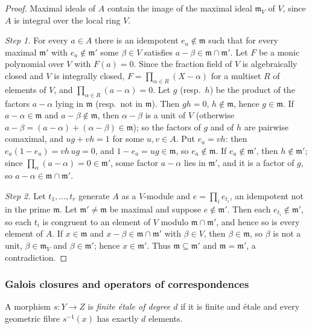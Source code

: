 \begin{proof}
Maximal ideals of $A$ contain the image of the maximal ideal $\mathfrak m_V$ of $V$, since $A$ is
integral over the local ring $V$.

\emph{Step 1.} For every $a\in A$ there is an idempotent $e_a\notin\mathfrak m$ such that for every
maximal $\mathfrak m'$ with $e_a\notin\mathfrak m'$ some $\beta\in V$ satisfies
$a-\beta\in\mathfrak m\cap\mathfrak m'$. Let $F$ be a monic polynomial over $V$ with $F(a)=0$. Since
the fraction field of $V$ is algebraically closed and $V$ is integrally closed, $F=\prod_{\alpha\in
R}(X-\alpha)$ for a multiset $R$ of elements of $V$, and $\prod_{\alpha\in R}(a-\alpha)=0$. Let $g$
(resp.\ $h$) be the product of the factors $a-\alpha$ lying in $\mathfrak m$ (resp.\ not in $\mathfrak
m$). Then $gh=0$, $h\notin\mathfrak m$, hence $g\in\mathfrak m$. If $a-\alpha\in\mathfrak m$ and
$a-\beta\notin\mathfrak m$, then $\alpha-\beta$ is a unit of $V$ (otherwise
$a-\beta=(a-\alpha)+(\alpha-\beta)\in\mathfrak m$); so the factors of $g$ and of $h$ are pairwise
comaximal, and $ug+vh=1$ for some $u,v\in A$. Put $e_a=vh$: then $e_a(1-e_a)=vh\,ug=0$, and
$1-e_a=ug\in\mathfrak m$, so $e_a\notin\mathfrak m$. If $e_a\notin\mathfrak m'$, then $h\notin\mathfrak
m'$; since $\prod_\alpha(a-\alpha)=0\in\mathfrak m'$, some factor $a-\alpha$ lies in $\mathfrak m'$, and
it is a factor of $g$, so $a-\alpha\in\mathfrak m\cap\mathfrak m'$.

\emph{Step 2.} Let $t_1,\dots,t_r$ generate $A$ as a $V$-module and $e=\prod_ie_{t_i}$, an idempotent
not in the prime $\mathfrak m$. Let $\mathfrak m'\ne\mathfrak m$ be maximal and suppose $e\notin
\mathfrak m'$. Then each $e_{t_i}\notin\mathfrak m'$, so each $t_i$ is congruent to an element of $V$
modulo $\mathfrak m\cap\mathfrak m'$, and hence so is every element of $A$. If $x\in\mathfrak m$ and
$x-\beta\in\mathfrak m\cap\mathfrak m'$ with $\beta\in V$, then $\beta\in\mathfrak m$, so $\beta$ is not
a unit, $\beta\in\mathfrak m_V$ and $\beta\in\mathfrak m'$; hence $x\in\mathfrak m'$. Thus
$\mathfrak m\subseteq\mathfrak m'$ and $\mathfrak m=\mathfrak m'$, a contradiction.
\end{proof}

\subsubsection{Galois closures and operators of correspondences}

A morphism $s\colon Y\to Z$ is \emph{finite \'etale of degree $d$} if it is finite and \'etale and
every geometric fibre $s^{-1}(x)$ has exactly $d$ elements.

